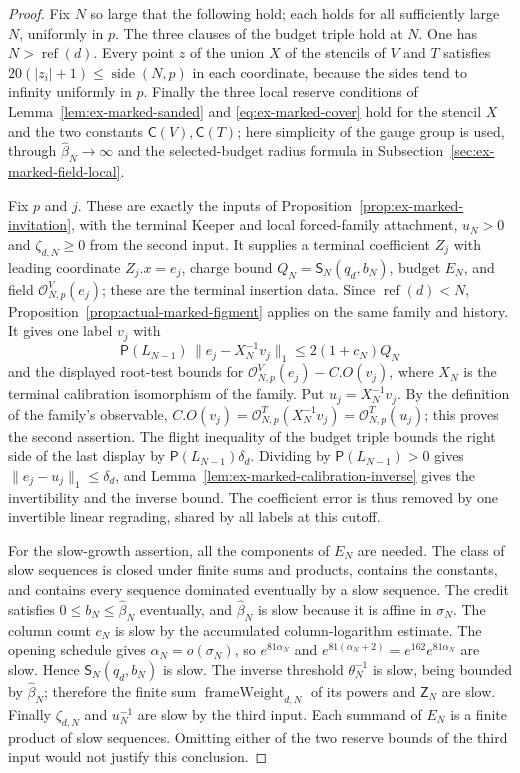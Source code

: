 \begin{proof}
Fix $N$ so large that the following hold; each holds for all sufficiently
large $N$, uniformly in $p$. The three clauses of the budget triple hold
at $N$. One has $N>\operatorname{ref}(d)$. Every point $z$ of the union
$X$ of the stencils of $V$ and $T$ satisfies
$20(|z_i|+1)\leq\operatorname{side}(N,p)$ in each coordinate, because the
sides tend to infinity uniformly in $p$. Finally the three local reserve
conditions of Lemma~\ref{lem:ex-marked-sanded} and
\eqref{eq:ex-marked-cover} hold for the stencil $X$ and the two constants
$\mathsf C(V),\mathsf C(T)$; here simplicity of the gauge group is used,
through $\widehat\beta_N\to\infty$ and the selected-budget radius
formula in Subsection~\ref{sec:ex-marked-field-local}.

Fix $p$ and $j$. These are exactly the inputs of
Proposition~\ref{prop:ex-marked-invitation}, with the terminal Keeper and local forced-family attachment,
$u_N>0$ and $\zeta_{d,N}\geq0$ from the second input. It supplies a
terminal coefficient $Z_j$ with leading coordinate $Z_j.x=e_j$, charge
bound $Q_N=\mathsf S_N(q_d,b_N)$, budget $E_N$, and field
$\mathcal O^{V}_{N,p}(e_j)$; these are the terminal insertion data. Since
$\operatorname{ref}(d)<N$, Proposition~\ref{prop:actual-marked-figment}
applies on the same family and history. It gives one label $v_j$ with
\[
 \mathsf P(L_{N-1})\,\|e_j-X_N^{-1}v_j\|_1\leq2(1+c_N)Q_N
\]
and the displayed root-test bounds for
$\mathcal O^{V}_{N,p}(e_j)-C.O(v_j)$, where $X_N$ is the terminal
calibration isomorphism of the family. Put $u_j=X_N^{-1}v_j$. By the
definition of the family's observable, $C.O(v_j)=\mathcal
O^{T}_{N,p}(X_N^{-1}v_j)=\mathcal O^{T}_{N,p}(u_j)$; this proves the
second assertion. The flight inequality of the budget triple bounds the
right side of the last display by $\mathsf P(L_{N-1})\delta_d$. Dividing
by $\mathsf P(L_{N-1})>0$ gives $\|e_j-u_j\|_1\leq\delta_d$, and
Lemma~\ref{lem:ex-marked-calibration-inverse} gives the invertibility and
the inverse bound. The coefficient error is thus removed by one
invertible linear regrading, shared by all labels at this cutoff.

For the slow-growth assertion, all the components of $E_N$ are needed.
The class of slow sequences is closed under finite sums and products,
contains the constants, and contains every sequence dominated eventually
by a slow sequence. The credit satisfies $0\leq b_N\leq\widehat\beta_N$
eventually, and $\widehat\beta_N$ is slow because it is affine in
$\sigma_N$. The column count $c_N$ is slow by the accumulated
column-logarithm estimate. The opening schedule gives
$\alpha_N=o(\sigma_N)$, so $e^{81\alpha_N}$ and
$e^{81(\alpha_N+2)}=e^{162}e^{81\alpha_N}$ are slow. Hence
$\mathsf S_N(q_d,b_N)$ is slow. The inverse threshold $\theta_N^{-1}$ is
slow, being bounded by $\widehat\beta_N$; therefore the finite sum
$\operatorname{frameWeight}_{d,N}$ of its powers and $\mathsf Z_N$ are slow.
Finally $\zeta_{d,N}$ and $u_N^{-1}$ are slow by the third input. Each
summand of $E_N$ is a finite product of slow sequences. Omitting either
of the two reserve bounds of the third input would not justify this
conclusion.
\end{proof}


